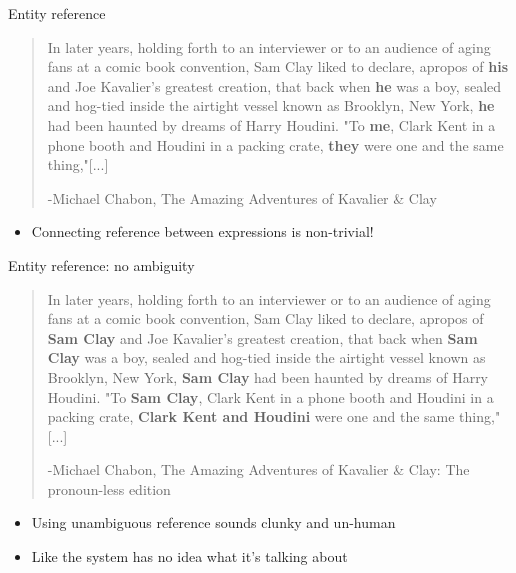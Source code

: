 \documentclass[10pt, compress]{beamer}
\begin{document}
\begin{frame}{Entity reference}
	\begin{quote}
		In later years, holding forth to an interviewer or to an audience of aging fans at a comic book convention, Sam Clay liked to declare, apropos of \textbf{his} and Joe Kavalier's greatest creation, that back when \textbf{he} was a boy, sealed and hog-tied inside the airtight vessel known as Brooklyn, New York, \textbf{he} had been haunted by dreams of Harry Houdini. "To \textbf{me}, Clark Kent in a phone booth and Houdini in a packing crate, \textbf{they} were one and the same thing,"[...]

		\medskip
		-Michael Chabon, The Amazing Adventures of Kavalier \& Clay
	\end{quote}

	\pause

	\begin{itemize}
		\item Connecting reference between expressions is non-trivial!
	\end{itemize}
\end{frame}

\begin{frame}{Entity reference: no ambiguity}
	\begin{quote}
		In later years, holding forth to an interviewer or to an audience of aging fans at a comic book convention, Sam Clay liked to declare, apropos of \textbf{Sam Clay} and Joe Kavalier's greatest creation, that back when \textbf{Sam Clay} was a boy, sealed and hog-tied inside the airtight vessel known as Brooklyn, New York, \textbf{Sam Clay} had been haunted by dreams of Harry Houdini. "To \textbf{Sam Clay}, Clark Kent in a phone booth and Houdini in a packing crate, \textbf{Clark Kent and Houdini} were one and the same thing,"[...]

		\medskip
		-Michael Chabon, The Amazing Adventures of Kavalier \& Clay: The pronoun-less edition
	\end{quote}

	\begin{itemize}
		\item Using unambiguous reference sounds clunky and un-human \pause
		\item Like the system has no idea what it's talking about
	\end{itemize}
\end{frame}
\end{document}
